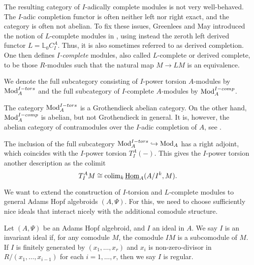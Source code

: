 \begin{remark}
    \label{ch0:rm:I-complete-vs-I-adically-complete}
    The resulting category of $I$-adically complete modules is not very well-behaved. The $I$-adic completion functor is often neither left nor right exact, and the category is often not abelian. To fix these issues, Greenlees and May introduced the notion of $L$-complete modules in \cite{greenlees-may_92}, using instead the zeroth left derived functor $L=\mathbb{L}_0 C_I^A$. Thus, it is also sometimes referred to as derived completion. One then defines \emph{$I$-complete} modules, also called $L$-complete or derived complete, to be those $R$-modules such that the natural map $M\longrightarrow L M$ is an equivalence. 
\end{remark}

\begin{notation}
    We denote the full subcategory consisting of $I$-power torsion $A$-modules by $\mathrm{Mod}_A^{I-tors}$ and the full subcategory of $I$-complete $A$-modules by $\mathrm{Mod}_A^{I-comp}$. 
\end{notation}

\begin{remark}
    The category $\mathrm{Mod}_A^{I-tors}$ is a Grothendieck abelian category. On the other hand, $\mathrm{Mod}_A^{I-comp}$ is abelian, but not Grothendieck in general. It is, however, the abelian category of contramodules over the $I$-adic completion of $A$, see \cite{positselski_2022_contramodules}. \citeme
\end{remark}

The inclusion of the full subcategory $\mathrm{Mod}_A^{I-tors}\hookrightarrow \mathrm{Mod}_A$ has a right adjoint, which coincides with the $I$-power torsion $T_I^A(-)$. This gives the $I$-power torsion another description as the colimit 
$$T_I^A M \cong \operatorname{colim}_k \operatorname{\underline{Hom}}_A (A/I^k, M).$$

We want to extend the construction of $I$-torsion and $L$-complete modules to general Adams Hopf algebroids $(A,\Psi)$. For this, we need to choose sufficiently nice ideals that interact nicely with the additional comodule structure. 

\begin{definition}
    Let $(A, \Psi)$ be an Adams Hopf algebroid, and $I$ an ideal in $A$. We say $I$ is an { invariant ideal} if, for any comodule $M$, the comodule $IM$ is a subcomodule of $M$. If $I$ is finitely generated by $(x_1, \ldots, x_r)$ and $x_i$ is non-zero-divisor in $R/(x_1, \ldots, x_{i-1})$ for each $i=1, \ldots, r$, then we say $I$ is { regular}. 
\end{definition}

